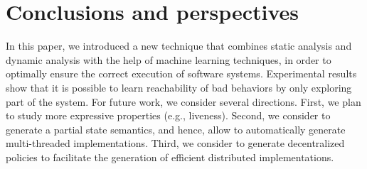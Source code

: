 \section{Conclusions and perspectives}
\label{sec:conclusion}
In this paper, we introduced a new technique that combines static analysis and dynamic analysis with the help of machine learning techniques, in order to optimally ensure the correct execution of software systems. 
Experimental results show that it is possible to learn reachability of bad behaviors by only exploring part of the system. 
For future work, we consider several directions. 
First, we plan to study more expressive properties (e.g., liveness). Second, we consider to generate a partial state semantics, and hence, allow to automatically generate multi-threaded implementations. Third, we consider to generate decentralized policies to facilitate the generation of efficient distributed implementations. 